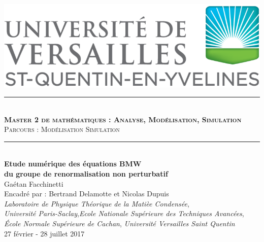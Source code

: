 \documentclass[10pt]{article}
\begin{document}
\begin{titlepage}
\begin{center}
\hspace*{20pt}
\includegraphics[scale=0.15]{Logo_Versailles.png}
\\


\vspace*{30pt}
\rule{10cm}{1pt}
\vspace*{10pt} \\
\textsc{\textbf{{\large Master 2 de mathématiques : Analyse, Modélisation, Simulation}}\\
 Parcours : Modélisation Simulation}\\
\rule{10cm}{1pt}
\vspace*{20pt} \\
\textbf{\LARGE Etude numérique des équations \og BMW \fg{} \\ du groupe de renormalisation non perturbatif}\\
\vspace*{10pt}
{\large Gaétan Facchinetti \\
Encadré par : Bertrand Delamotte  et Nicolas Dupuis }
{ \\
\vspace*{15pt}
\textit{Laboratoire de Physique Théorique de la Matièe Condensée},\\
\vspace*{5pt}
\textit{Université Paris-Saclay},\textit{Ecole Nationale Supérieure des Techniques Avancées}, \\
\textit{École Normale Supérieure de Cachan}, \textit{Université Versailles Saint Quentin}}\\
\vspace*{20pt}
{ 27 février - 28 juillet 2017 }


\end{center}

\vspace*{-25pt}


\end{titlepage}
\end{document}
